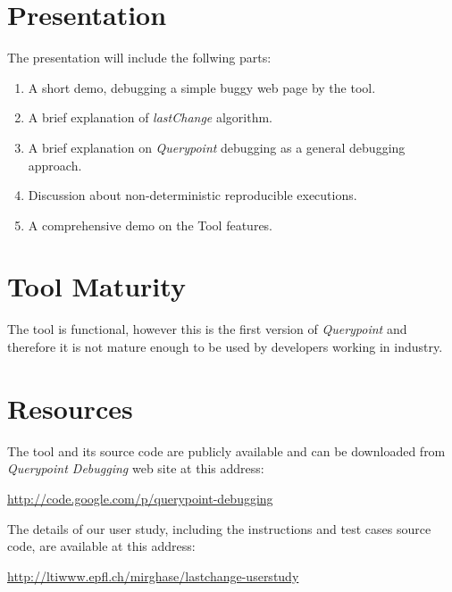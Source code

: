 \documentclass{sig-alternate}
\begin{document}
%
%

\appendix
\section{Presentation}
The presentation will include the follwing parts:
\begin{enumerate}
	\item A short demo, debugging a simple buggy web page by the tool.
	\item A brief explanation of \textit{lastChange} algorithm.
	\item A brief explanation on \textit{Querypoint} debugging as a general debugging approach.
	\item Discussion about non-deterministic reproducible executions.
	\item A comprehensive demo on the Tool features.
\end{enumerate}

\section{Tool Maturity}
The tool is functional, however this is the first version of \textit{Querypoint} and therefore it is 
not mature enough to be used by developers working in industry.

\section{Resources}
The tool and its source code are publicly available and can be downloaded 
from \textit{Querypoint Debugging} web site at this address:

\mbox{\href{http://code.google.com/p/querypoint-debugging}{http://code.google.com/p/querypoint-debugging}}

The details of our user study, including the instructions and test cases source code, are available at this address:

\mbox{\href{http://ltiwww.epfl.ch/~mirghase/lastchange-userstudy}{http://ltiwww.epfl.ch/\texttildelow mirghase/lastchange-userstudy}}
\end{document}
